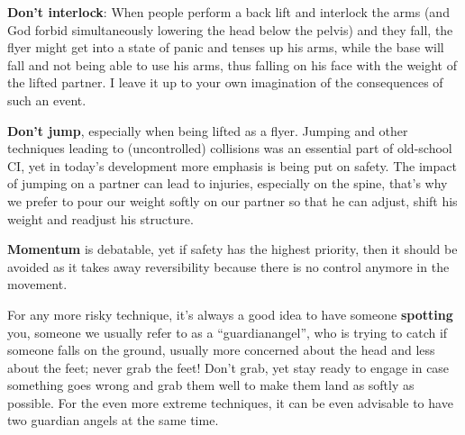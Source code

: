 \vspace{5pt}
\noindent \textbf{Don't interlock}: When people perform a back lift and interlock the arms (and God forbid simultaneously lowering the head below the pelvis) and they fall, the flyer might get into a state of panic and tenses up his arms, while the base will fall and not being able to use his arms, thus falling on his face with the weight of the lifted partner.
I leave it up to your own imagination of the consequences of such an event.

\vspace{5pt}
\noindent \textbf{Don't jump}, especially when being lifted as a flyer.
Jumping and other techniques leading to (uncontrolled) collisions was an essential part of old-school CI, yet in today's development more emphasis is being put on safety.
The impact of jumping on a partner can lead to injuries, especially on the spine, that's why we prefer to pour our weight softly on our partner so that he can adjust, shift his weight and readjust his structure.

\vspace{5pt}
\noindent \textbf{Momentum} is debatable, yet if safety has the highest priority, then it should be avoided as it takes away reversibility because there is no control anymore in the movement.

\vspace{10pt}

For any more risky technique, it's always a good idea to have someone \textbf{spotting} you, someone we usually refer to as a ``\gls{guardianangel}'', who is trying to catch if someone falls on the ground, usually more concerned about the head and less about the feet; never grab the feet!
Don't grab, yet stay ready to engage in case something goes wrong and grab them well to make them land as softly as possible.
For the even more extreme techniques, it can be even advisable to have two guardian angels at the same time.

